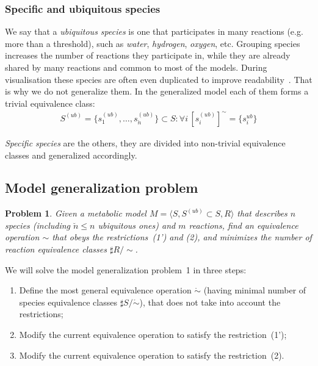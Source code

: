 \documentclass[9pt]{article}
\newcounter{pbm}
\newcounter{rm}
\begin{document}
\subsubsection*{Specific and ubiquitous species}
We say that a \emph{ubiquitous species} is one that participates in many reactions (e.g. more than a threshold), such as \emph{water}, \emph{hydrogen}, \emph{oxygen}, etc. Grouping species increases the number of reactions they participate in, while they are already shared by many reactions and common to most of the models. During visualisation these species are often even duplicated to improve readability~\citep{Rohn2012}. That is why we do not generalize them. In the generalized model each of them forms a trivial equivalence class:
\[ \begin{array}{l}
\mbox{$S^{(ub)} = \{s^{(ub)}_1, \ldots, s^{(ub)}_{\breve{n}}\} \subset S: \forall i\,[s^{(ub)}_i]^{\sim} = \{s^{ub}_i\}$} 
\end{array} \]

\emph{Specific species} are the others, they are divided into non-trivial equivalence classes and generalized accordingly.  

\subsection*{Model generalization problem}
\newtheorem{p0}[pbm]{Problem}
\begin{p0}
Given a metabolic model $M=\langle S, S^{(ub)} \subset S, R \rangle$ that describes $n$ species (including $\breve{n} \leq n$ ubiquitous ones) and $m$ reactions, find an equivalence operation $\sim$ that obeys the restrictions~(1') and (2), and minimizes the number of reaction equivalence classes $\sharp R/\sim$.
\end{p0}

We will solve the model generalization problem~1 in three steps:
\begin{enumerate}
\item Define the most general equivalence operation $\mathring{\sim}$ (having minimal number of species equivalence classes $\sharp{S/\mathring{\sim}}$), that does not take into account the restrictions;
\item Modify the current equivalence operation to satisfy the restriction~(1');
\item Modify the current equivalence operation to satisfy the restriction~(2).
\end{enumerate}
\end{document}
